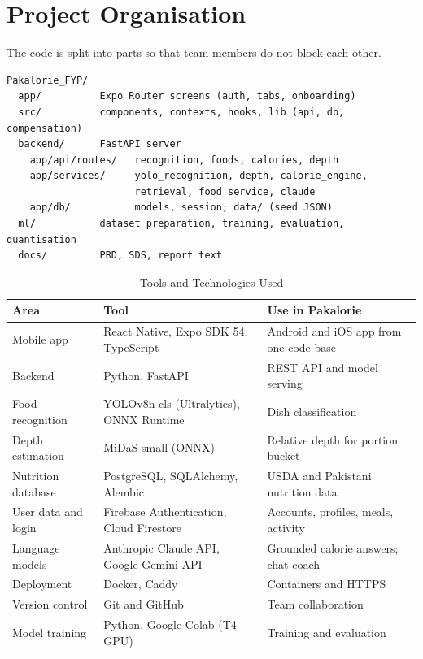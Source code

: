 \section{Project Organisation}
The code is split into parts so that team members do not block each other.
\begin{verbatim}
Pakalorie_FYP/
  app/          Expo Router screens (auth, tabs, onboarding)
  src/          components, contexts, hooks, lib (api, db, compensation)
  backend/      FastAPI server
    app/api/routes/   recognition, foods, calories, depth
    app/services/     yolo_recognition, depth, calorie_engine,
                      retrieval, food_service, claude
    app/db/           models, session; data/ (seed JSON)
  ml/           dataset preparation, training, evaluation, quantisation
  docs/         PRD, SDS, report text
\end{verbatim}

\begin{table}[H]
\centering
\caption{Tools and Technologies Used}
\label{tab:tools}
\small
\begin{tabularx}{\textwidth}{|>{\raggedright\arraybackslash}p{3.4cm}|>{\raggedright\arraybackslash}p{4.8cm}|>{\raggedright\arraybackslash}X|}
\hline
\textbf{Area} & \textbf{Tool} & \textbf{Use in Pakalorie} \\ \hline
Mobile app & React Native, Expo SDK 54, TypeScript & Android and iOS app from one code base~\cite{expo} \\ \hline
Backend & Python, FastAPI & REST API and model serving~\cite{fastapi} \\ \hline
Food recognition & YOLOv8n-cls (Ultralytics), ONNX Runtime & Dish classification~\cite{yolo_ult} \\ \hline
Depth estimation & MiDaS small (ONNX) & Relative depth for portion bucket~\cite{midas} \\ \hline
Nutrition database & PostgreSQL, SQLAlchemy, Alembic & USDA and Pakistani nutrition data~\cite{usda} \\ \hline
User data and login & Firebase Authentication, Cloud Firestore & Accounts, profiles, meals, activity~\cite{firebase} \\ \hline
Language models & Anthropic Claude API, Google Gemini API & Grounded calorie answers; chat coach~\cite{anthropic,gemini} \\ \hline
Deployment & Docker, Caddy & Containers and HTTPS~\cite{docker,caddy} \\ \hline
Version control & Git and GitHub & Team collaboration \\ \hline
Model training & Python, Google Colab (T4 GPU) & Training and evaluation \\ \hline
\end{tabularx}
\end{table}

